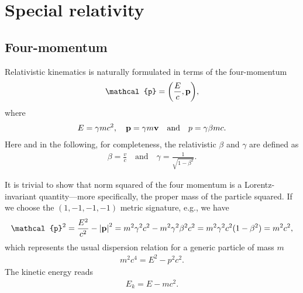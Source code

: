 \chapter{Special relativity}\label{chap:relativity}


\section{Four-momentum}

Relativistic kinematics is naturally formulated in terms of the
four-momentum
\begin{align}
  \mathcal{p} = \qty(\frac{E}{c}, \vb{p}),
\end{align}
where
\begin{align*}
  E = \gamma m c^2, \quad
  \vb{p} = \gamma m \vb{v} \quad\text{and}\quad
  p = \gamma\beta m c.
\end{align*}
Here and in the following, for completeness, the relativistic $\beta$ and $\gamma$
are defined as
\begin{align*}
  \beta = \frac{v}{c}
  \quad\text{and}\quad
  \gamma = \frac{1}{\sqrt{1 - \beta^2}}.
\end{align*}

It is trivial to show that norm squared of the four momentum is a Lorentz-invariant
quantity---more specifically, the proper mass of the particle squared. If we choose the
$(1, -1, -1, -1)$ metric signature, e.g., we have
\begin{align*}
  \mathcal{p}^2 = \frac{E^2}{c^2} - \abs{\vb{p}}^2 =
  m^2 \gamma^2 c^2 - m^2 \gamma^2 \beta^2 c^2 =
  m^2 \gamma^2 c^2 (1 - \beta^2) = m^2c^2,
\end{align*}
which represents the usual dispersion relation for a generic particle of mass $m$
\begin{align}
  m^2 c^4 = E^2 - p^2c^2.
\end{align}
The kinetic energy reads
\begin{align}
  E_k = E - mc^2.
\end{align}

